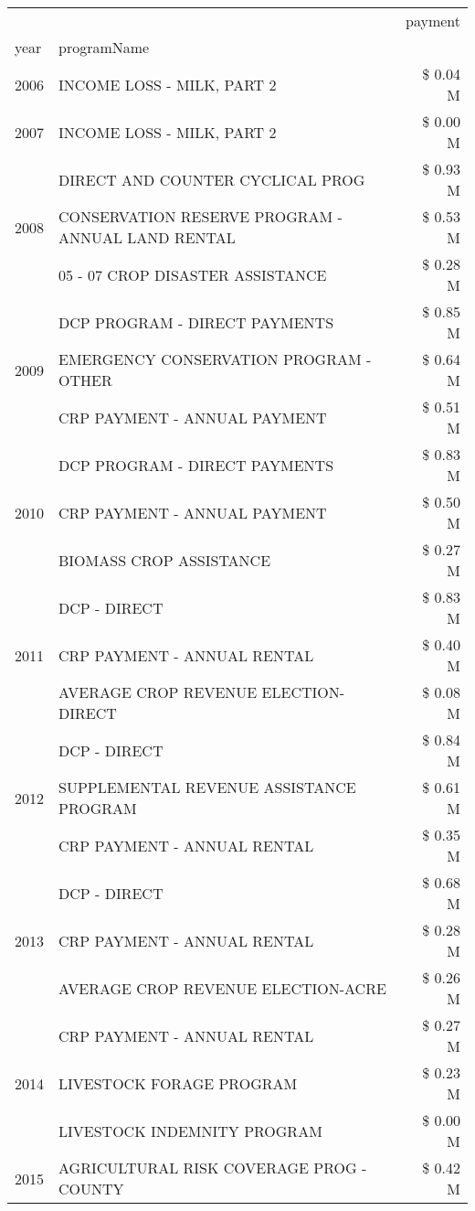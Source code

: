 \begin{tabular}{llr}
\toprule
 &  & payment \\
year & programName &  \\
\midrule
2006 & INCOME LOSS - MILK, PART 2 & \$ 0.04 M \\
\cline{1-3}
2007 & INCOME LOSS - MILK, PART 2 & \$ 0.00 M \\
\cline{1-3}
\multirow[t]{3}{*}{2008} & DIRECT AND COUNTER CYCLICAL PROG & \$ 0.93 M \\
 & CONSERVATION RESERVE PROGRAM - ANNUAL LAND RENTAL & \$ 0.53 M \\
 & 05 - 07 CROP DISASTER ASSISTANCE & \$ 0.28 M \\
\cline{1-3}
\multirow[t]{3}{*}{2009} & DCP PROGRAM - DIRECT PAYMENTS & \$ 0.85 M \\
 & EMERGENCY CONSERVATION PROGRAM - OTHER & \$ 0.64 M \\
 & CRP PAYMENT - ANNUAL PAYMENT & \$ 0.51 M \\
\cline{1-3}
\multirow[t]{3}{*}{2010} & DCP PROGRAM - DIRECT PAYMENTS & \$ 0.83 M \\
 & CRP PAYMENT - ANNUAL PAYMENT & \$ 0.50 M \\
 & BIOMASS CROP ASSISTANCE & \$ 0.27 M \\
\cline{1-3}
\multirow[t]{3}{*}{2011} & DCP - DIRECT & \$ 0.83 M \\
 & CRP PAYMENT - ANNUAL RENTAL & \$ 0.40 M \\
 & AVERAGE CROP REVENUE ELECTION-DIRECT & \$ 0.08 M \\
\cline{1-3}
\multirow[t]{3}{*}{2012} & DCP - DIRECT & \$ 0.84 M \\
 & SUPPLEMENTAL REVENUE ASSISTANCE PROGRAM & \$ 0.61 M \\
 & CRP PAYMENT - ANNUAL RENTAL & \$ 0.35 M \\
\cline{1-3}
\multirow[t]{3}{*}{2013} & DCP - DIRECT & \$ 0.68 M \\
 & CRP PAYMENT - ANNUAL RENTAL & \$ 0.28 M \\
 & AVERAGE CROP REVENUE ELECTION-ACRE & \$ 0.26 M \\
\cline{1-3}
\multirow[t]{3}{*}{2014} & CRP PAYMENT - ANNUAL RENTAL & \$ 0.27 M \\
 & LIVESTOCK FORAGE PROGRAM & \$ 0.23 M \\
 & LIVESTOCK INDEMNITY PROGRAM & \$ 0.00 M \\
\cline{1-3}
\multirow[t]{3}{*}{2015} & AGRICULTURAL RISK COVERAGE PROG - COUNTY & \$ 0.42 M \\

\end{tabular}
